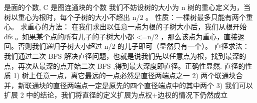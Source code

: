 {}\markdownRendererDollarSign{}是面的个数,\markdownRendererDollarSign{} C\markdownRendererSoftLineBreak
{}\markdownRendererDollarSign{}是图连通块的个数\markdownRendererInterblockSeparator
{}
\markdownRendererSectionEnd \markdownRendererSectionBegin
{}\markdownRendererInterblockSeparator
{}\markdownRendererSectionBegin
{}\markdownRendererInterblockSeparator
{}我们不妨设树的大小为\markdownRendererDollarSign{} n \markdownRendererDollarSign{}\markdownRendererParagraphSeparator
{}树的重心定义为，当树以重心为根时，每个子树的大小不超出\markdownRendererDollarSign{} n/2 \markdownRendererDollarSign{}。\markdownRendererParagraphSeparator
{}性质：一棵树最多只能有两个重心。\markdownRendererParagraphSeparator
{}求重心的方法：\markdownRendererParagraphSeparator
{}在我们求出以任意一点为根的子树大小后，我们从根开始\markdownRendererDollarSign{} dfs \markdownRendererDollarSign{}。如果某个点的所有儿子的子树大小都\markdownRendererDollarSign{} <=n/2 \markdownRendererDollarSign{}，那么该点为重心，直接返回。否则我们递归子树大小超过\markdownRendererDollarSign{} n/2 \markdownRendererDollarSign{}的儿子即可（显然只有一个）。\markdownRendererInterblockSeparator
{}\markdownRendererInterblockSeparator
{}
\markdownRendererSectionEnd \markdownRendererSectionBegin
{}\markdownRendererInterblockSeparator
{}直径求法：\markdownRendererParagraphSeparator
{}我们通过二次\markdownRendererDollarSign{} BFS \markdownRendererDollarSign{}解决直径问题，也就是说我们先以任意点为根，找到最深的点，再次从最深的点开始二次\markdownRendererDollarSign{} BFS\markdownRendererSoftLineBreak
{}\markdownRendererDollarSign{},得到最大深度即直径。正确性显然.\markdownRendererInterblockSeparator
{}\markdownRendererInterblockSeparator
{}直径的性质\markdownRendererParagraphSeparator
{}\markdownRendererDollarSign{} 1) \markdownRendererDollarSign{}树上任意一点，离它最远的一点必然是直径两端点之一\markdownRendererParagraphSeparator
{}\markdownRendererDollarSign{} 2) \markdownRendererDollarSign{}两个联通块合并，新联通块的直径两端点一定是原先的四个直径端点中的其中两个\markdownRendererParagraphSeparator
{}\markdownRendererDollarSign{} 3) \markdownRendererDollarSign{}我们可以扩展\markdownRendererDollarSign{} 2 \markdownRendererDollarSign{}中的结论，我们将直径的定义扩展为点权+边权的情况下仍然成立\markdownRendererParagraphSeparator
